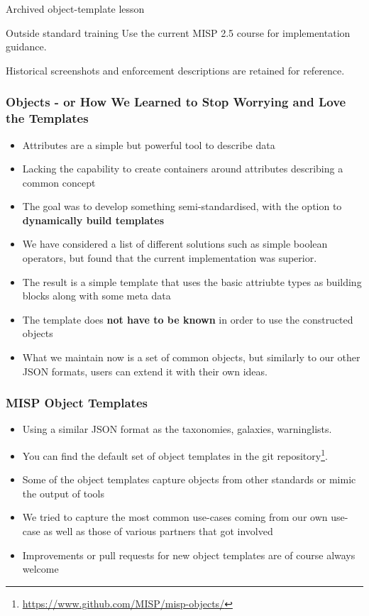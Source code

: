 
\begin{frame}[t,plain]
\titlepage
\end{frame}
\begin{frame}{Archived object-template lesson}
\begin{alertblock}{Outside standard training}
Use the current MISP 2.5 course for implementation guidance.
\end{alertblock}
Historical screenshots and enforcement descriptions are retained for reference.
\end{frame}

\begin{frame}
\frametitle{Objects - or How We Learned to Stop Worrying and Love the Templates}
\begin{itemize}
   \item Attributes are a simple but powerful tool to describe data
   \item Lacking the capability to create containers around attributes describing a common concept
   \item The goal was to develop something semi-standardised, with the option to {\bf dynamically build templates}
   \item We have considered a list of different solutions such as simple boolean operators, but found that the current implementation was superior.
   \item The result is a simple template that uses the basic attriubte types as building blocks along with some meta data
   \item The template does {\bf not have to be known} in order to use the constructed objects
   \item What we maintain now is a set of common objects, but similarly to our other JSON formats, users can extend it with their own ideas.
\end{itemize}
\end{frame}

\begin{frame}
\frametitle{MISP Object Templates}
\begin{itemize}
\item Using a similar JSON format as the taxonomies, galaxies, warninglists.
\item You can find the default set of object templates in the git repository\footnote{\url{https://www.github.com/MISP/misp-objects/}}.
\item Some of the object templates capture objects from other standards or mimic the output of tools
\item We tried to capture the most common use-cases coming from our own use-case as well as those of various partners that got involved
\item Improvements or pull requests for new object templates are of course always welcome
\end{itemize}
\end{frame}

